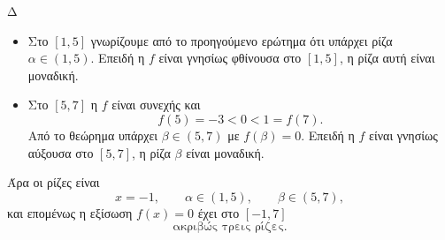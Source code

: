 \begin{thema}{Δ}
\begin{erwthma}
\begin{itemize}
\item Στο $[1,5]$ γνωρίζουμε από το προηγούμενο ερώτημα ότι υπάρχει
ρίζα $\alpha\in(1,5)$. Επειδή η $f$ είναι γνησίως φθίνουσα στο
$[1,5]$, η ρίζα αυτή είναι μοναδική.

\item Στο $[5,7]$ η $f$ είναι συνεχής και
\[
f(5)=-3<0<1=f(7).
\]
Από το θεώρημα  υπάρχει $\beta\in(5,7)$ με $f(\beta)=0$.
Επειδή η $f$ είναι γνησίως αύξουσα στο $[5,7]$, η ρίζα $\beta$ είναι
μοναδική.
\end{itemize}

Άρα οι ρίζες είναι
\[
x=-1,\qquad \alpha\in(1,5),\qquad \beta\in(5,7),
\]
και επομένως η εξίσωση $f(x)=0$ έχει στο $[-1,7]$
\[
{\text{ακριβώς τρεις ρίζες}}.
\]
\end{erwthma}
\end{thema}

